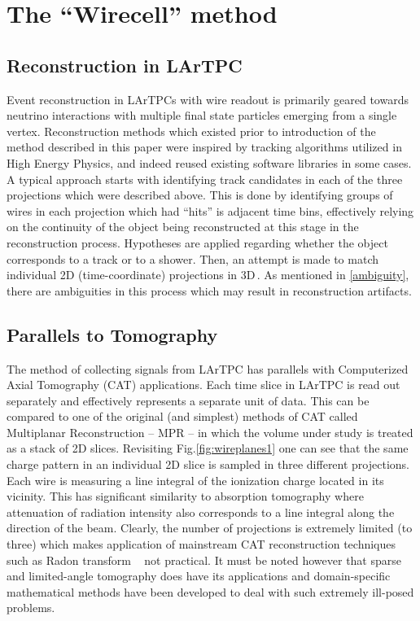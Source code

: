 \documentclass[a4paper]{jpconf}
\begin{document}
\section{The ``Wirecell'' method}
\subsection{Reconstruction in LArTPC}
Event reconstruction in LArTPCs with wire readout is primarily geared towards neutrino interactions
with multiple final state particles emerging from  a single vertex. 
Reconstruction methods which existed prior to introduction of the method described in this paper were inspired by tracking
algorithms utilized in High Energy Physics, and indeed reused existing software libraries
in some cases. A typical approach starts with identifying track candidates in each of the three projections which were described
above. This is done by identifying groups of wires in each projection which had ``hits'' is adjacent time bins, effectively relying
on the continuity of the object being reconstructed at this stage in the reconstruction process. Hypotheses are applied regarding
whether the object corresponds to a track or to a shower. Then, an attempt is made to match individual 2D (time-coordinate)
projections in 3D\,\cite{icarus}. As mentioned in \ref{ambiguity}, there are ambiguities in this process which may result in
reconstruction artifacts.


\subsection{Parallels to Tomography}
The method of collecting signals from LArTPC has  parallels with Computerized Axial Tomography
(CAT) applications. Each time slice in LArTPC is read out separately and effectively represents a separate unit of data.
This can be compared to one of the original (and simplest) methods of CAT
called Multiplanar Reconstruction -- MPR -- in which the volume under study is treated as a stack of 2D slices. Revisiting
Fig.\ref{fig:wireplanes1} one can see that the same charge pattern in an individual 2D slice is sampled in three different projections.
Each wire is  measuring a line integral of the ionization charge located in its vicinity. This has significant similarity
to absorption tomography where attenuation of radiation intensity also corresponds to a line integral along
the direction of the beam. Clearly, the number of projections is extremely limited (to three) which makes application of mainstream
CAT reconstruction techniques such as Radon transform ~\cite{radon1}
not practical. It must be noted however that sparse and limited-angle tomography
does have its applications and domain-specific mathematical methods have been developed to deal with such extremely ill-posed problems.
\end{document}
